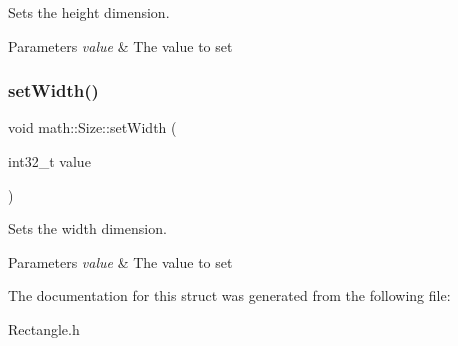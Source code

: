 Sets the height dimension. 


\begin{DoxyParams}{Parameters}
{\em value} & The value to set\\
\hline
\end{DoxyParams}
\mbox{\label{structmath_1_1_size_a35d3e4657cee6ddb1526242a32e0cab7}} 
\subsubsection{\texorpdfstring{setWidth()}{setWidth()}}
{\footnotesize\ttfamily void math\+::\+Size\+::set\+Width (\begin{DoxyParamCaption}\item[{int32\+\_\+t}]{value }\end{DoxyParamCaption})\hspace{0.3cm}{\ttfamily [inline]}}



Sets the width dimension. 


\begin{DoxyParams}{Parameters}
{\em value} & The value to set\\
\hline
\end{DoxyParams}


The documentation for this struct was generated from the following file\+:\begin{DoxyCompactItemize}
\item 
Rectangle.\+h\end{DoxyCompactItemize}
